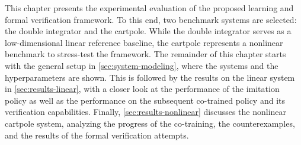 This chapter presents the experimental evaluation of the proposed learning and formal verification framework. 
To this end, two benchmark systems are selected: the double integrator and the cartpole. 
While the double integrator serves as a low-dimensional linear reference baseline, 
the cartpole represents a nonlinear benchmark to stress-test the framework.
The remainder of this chapter starts with the general setup in \cref{sec:system-modeling}, 
where the systems and the hyperparameters are shown. This is followed by the results on 
the linear system in \cref{sec:results-linear}, with a closer look at the performance of the 
imitation policy as well as the performance on the subsequent co-trained policy and its 
verification capabilities.
Finally, \cref{sec:results-nonlinear} discusses the nonlinear cartpole system, analyzing the 
progress of the co-training, the counterexamples, and the results of the formal verification attempts.